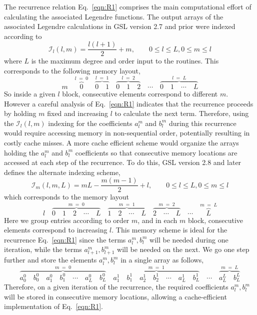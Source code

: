 \documentclass[12pt]{article}
\begin{document}
The recurrence relation Eq.~\eqref{eqn:R1} comprises the main computational effort of calculating
the associated Legendre functions.  The output arrays of the associated Legendre calculations in GSL
version 2.7 and prior were indexed according to
\begin{equation}
\mathcal{I}_l(l,m) = \frac{l(l+1)}{2} + m, \qquad 0 \leq l \leq L, 0 \leq m \leq l
\end{equation}
where $L$ is the maximum degree and order input to the routines. This corresponds to
the following memory layout,
$$
m \quad \overbrace{0}^{l \; = \; 0} \quad \overbrace{0 \quad 1}^{l \; = \; 1} \quad \overbrace{0 \quad 1 \quad 2}^{l \; = \; 2} \quad \cdots \quad \overbrace{0 \quad 1 \quad \cdots \quad L}^{l \; = \; L}
$$
So inside a given $l$ block, consecutive elements correspond to different $m$. However a careful analysis
of Eq.~\eqref{eqn:R1} indicates that the recurrence proceeds by holding $m$ fixed and increasing $l$ to
calculate the next term. Therefore, using the $\mathcal{I}_l(l,m)$ indexing for the coefficients $a_l^m$
and $b_l^m$ during this recurrence would require accessing memory in non-sequential order, potentially resulting
in costly cache misses. A more cache efficient scheme would organize the arrays holding the $a_l^m$ and $b_l^m$
coefficients so that consecutive memory locations are accessed at each step of the recurrence. To do this,
GSL version 2.8 and later defines the alternate indexing scheme,
\begin{equation}
\mathcal{I}_m(l,m,L) = m L - \frac{m(m-1)}{2} + l, \qquad 0 \leq l \leq L, 0 \leq m \leq l
\end{equation}
which corresponds to the memory layout
$$
l \quad \overbrace{0 \quad 1 \quad 2 \quad \cdots \quad L}^{m \; = \; 0} \quad \overbrace{1 \quad 2 \quad \cdots \quad L}^{m \; = \; 1} \quad \overbrace{2 \quad \cdots \quad L}^{m \; = \; 2} \quad \cdots \quad \overbrace{L}^{m \; = \; L}
$$
Here we group entries according to order $m$, and in each $m$ block, consecutive elements correspond to increasing $l$.
This memory scheme is ideal for the recurrence Eq.~\eqref{eqn:R1} since the terms $a_l^m,b_l^m$ will be needed
during one iteration, while the terms $a_{l+1}^m,b_{l+1}^m$ will be needed on the next. We go one step further and
store the elements $a_l^m,b_l^m$ in a single array as follows,
$$
\overbrace{a_0^0 \quad b_0^0 \quad a_1^0 \quad b_1^0 \quad \cdots \quad a_L^0 \quad b_L^0}^{m \; = \; 0} \quad \overbrace{a_1^1 \quad b_1^1 \quad a_2^1 \quad b_2^1 \quad \cdots \quad a_L^1 \quad b_L^1}^{m \; = \; 1} \quad \cdots \quad \overbrace{a_L^L \quad b_L^L}^{m \; = \; L}
$$
Therefore, on a given iteration of the recurrence, the required coefficients $a_l^m,b_l^m$ will be stored in
consecutive memory locations, allowing a cache-efficient implementation of Eq.~\eqref{eqn:R1}.
\end{document}
